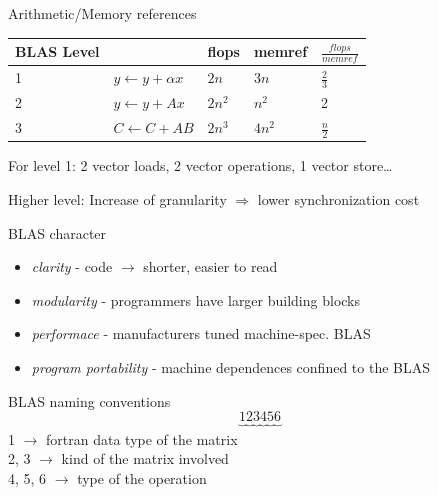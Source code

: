 	\begin{frame}{Arithmetic/Memory references}
		\begin{tabular}{ | l | l | l | l | l |}
		\hline
		BLAS Level & 		& flops 	&memref 	& $\frac{flops}{mem ref}$ \\ \hline
		1 & $y \leftarrow y + \alpha x$ 	& $2n$ 	& $3n$ 	& $\frac{2}{3} $ \\ \hline
		2 & $y \leftarrow y + Ax$ 		& $2n^2$ 	& $n^2$ 	& 2 			\\ \hline
		3 & $C \leftarrow C + AB$ 	& $2n^3$ 	& $4n^2$ 	& $\frac{n}{2}$ 	\\ \hline
		\end{tabular}
		
		For level 1: 2 vector loads, 2 vector operations, 1 vector store\dots 
		
		Higher level: Increase of granularity $\Rightarrow$ lower synchronization cost
	\end{frame}
	\begin{frame}{BLAS character}
		\begin{itemize}
			\item \textit{clarity} - code $\rightarrow$ shorter, easier to read
			\item \textit{modularity} - programmers have larger building blocks
			\item \textit{performace} - manufacturers tuned machine-spec. BLAS
			\item \textit{program portability} - machine dependences confined to the BLAS
		\end{itemize}
	\end{frame}
	\begin{frame}{BLAS naming conventions}
	\[
		\underbrace{1}_{} \underbrace{2}_{} \underbrace{3}_{} \underbrace{4}_{} \underbrace{5}_{} \underbrace{6}_{}
	\]
	1 $\rightarrow$ fortran data type of the matrix \\
	2, 3 $\rightarrow$ kind of the matrix involved \\
	4, 5, 6 $\rightarrow$ type of the operation
	\end{frame}
	